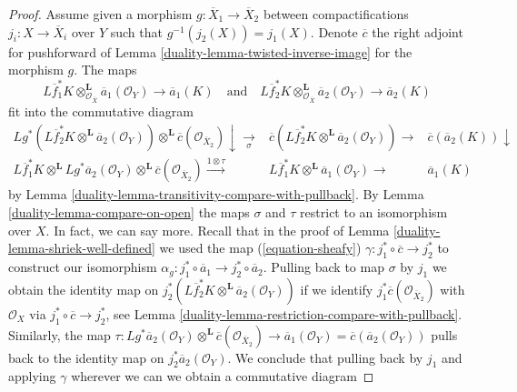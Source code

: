 \begin{proof}
\medskip\noindent
Assume given a morphism $g : \overline{X}_1 \to \overline{X}_2$
between compactifications $j_i : X \to \overline{X}_i$ over $Y$
such that $g^{-1}(j_2(X)) = j_1(X)$. Denote $\overline{c}$ the
right adjoint for pushforward of Lemma \ref{duality-lemma-twisted-inverse-image}
for the morphism $g$. The maps
$$
L\overline{f}_1^*K \otimes_{\mathcal{O}_{\overline{X}}}^\mathbf{L}
\overline{a}_1(\mathcal{O}_Y)
\longrightarrow
\overline{a}_1(K)
\quad\text{and}\quad
L\overline{f}_2^*K \otimes_{\mathcal{O}_{\overline{X}}}^\mathbf{L}
\overline{a}_2(\mathcal{O}_Y)
\longrightarrow
\overline{a}_2(K)
$$
fit into the commutative diagram
$$
\begin{array}{ccc}Lg^*(L\overline{f}_2^*K \otimes^\mathbf{L}
\overline{a}_2(\mathcal{O}_Y))
\otimes^\mathbf{L} \overline{c}(\mathcal{O}_{\overline{X}_2})
\downarrow\underset{\sigma}{\longrightarrow} & \overline{c}(L\overline{f}_2^*K \otimes^\mathbf{L}
\overline{a}_2(\mathcal{O}_Y)) \longrightarrow & \overline{c}(\overline{a}_2(K)) \downarrow \\ L\overline{f}_1^*K \otimes^\mathbf{L} Lg^*\overline{a}_2(\mathcal{O}_Y)
\otimes^\mathbf{L} \overline{c}(\mathcal{O}_{\overline{X}_2})
\overset{1 \otimes \tau}{\longrightarrow} & L\overline{f}_1^*K \otimes^\mathbf{L} \overline{a}_1(\mathcal{O}_Y) \longrightarrow & \overline{a}_1(K)\end{array}
$$
by Lemma \ref{duality-lemma-transitivity-compare-with-pullback}. By
Lemma \ref{duality-lemma-compare-on-open} the maps $\sigma$ and $\tau$
restrict to an isomorphism over $X$. In fact, we can say more.
Recall that in the proof of Lemma \ref{duality-lemma-shriek-well-defined} we used
the map (\ref{equation-sheafy}) $\gamma : j_1^* \circ \overline{c} \to j_2^*$
to construct our isomorphism
$\alpha_g : j_1^* \circ \overline{a}_1 \to j_2^* \circ \overline{a}_2$.
Pulling back to map $\sigma$ by $j_1$ we obtain the identity
map on $j_2^*\left(L\overline{f}_2^*K \otimes^\mathbf{L}
\overline{a}_2(\mathcal{O}_Y)\right)$ if we identify
$j_1^*\overline{c}(\mathcal{O}_{\overline{X}_2})$
with $\mathcal{O}_X$ via $j_1^* \circ \overline{c} \to j_2^*$, see
Lemma \ref{duality-lemma-restriction-compare-with-pullback}.
Similarly, the map $\tau : Lg^*\overline{a}_2(\mathcal{O}_Y)
\otimes^\mathbf{L} \overline{c}(\mathcal{O}_{\overline{X}_2}) \to
\overline{a}_1(\mathcal{O}_Y) = \overline{c}(\overline{a}_2(\mathcal{O}_Y))$
pulls back to the identity map on $j_2^*\overline{a}_2(\mathcal{O}_Y)$.
We conclude that pulling back by $j_1$ and applying $\gamma$ wherever
we can we obtain a commutative diagram

\end{proof}
